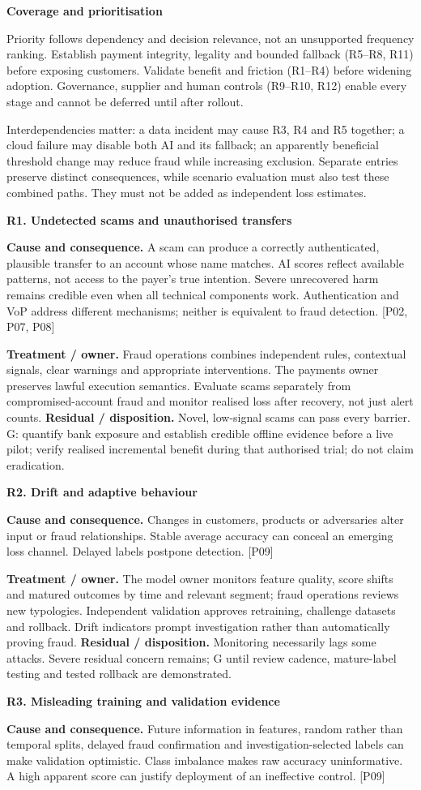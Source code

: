 \documentclass[11pt,a4paper]{article}
\newcommand{\heading}[2]{\vspace*{1mm}{\small\color{ink}\textbf{#1}}\par\vspace{2mm}{\LARGE\color{ink}\textbf{#2}}\par\vspace{3mm}}
\newcommand{\sub}[1]{\par\vspace{2mm}\textbf{\color{ink}#1}\par}
\newcommand{\src}[1]{{\small[#1]}}
\newcommand{\newpageof}[2]{\clearpage\normalsize\fontsize{10.5}{12.5}\selectfont\heading{#1}{#2}}
\newcommand{\risk}[2]{\sub{#1. #2}}
\begin{document}
\sub{Coverage and prioritisation}
Priority follows dependency and decision relevance, not an unsupported frequency ranking. Establish payment integrity, legality and bounded fallback (R5--R8, R11) before exposing customers. Validate benefit and friction (R1--R4) before widening adoption. Governance, supplier and human controls (R9--R10, R12) enable every stage and cannot be deferred until after rollout.

Interdependencies matter: a data incident may cause R3, R4 and R5 together; a cloud failure may disable both AI and its fallback; an apparently beneficial threshold change may reduce fraud while increasing exclusion. Separate entries preserve distinct consequences, while scenario evaluation must also test these combined paths. They must not be added as independent loss estimates.

\newpageof{7 | Analysis and evaluation}{Fraud, model evidence and false rejection}
\risk{R1}{Undetected scams and unauthorised transfers}
\textbf{Cause and consequence.} A scam can produce a correctly authenticated, plausible transfer to an account whose name matches. AI scores reflect available patterns, not access to the payer's true intention. Severe unrecovered harm remains credible even when all technical components work. Authentication and VoP address different mechanisms; neither is equivalent to fraud detection. \src{P02, P07, P08}

\textbf{Treatment / owner.} Fraud operations combines independent rules, contextual signals, clear warnings and appropriate interventions. The payments owner preserves lawful execution semantics. Evaluate scams separately from compromised-account fraud and monitor realised loss after recovery, not just alert counts. \textbf{Residual / disposition.} Novel, low-signal scams can pass every barrier. G: quantify bank exposure and establish credible offline evidence before a live pilot; verify realised incremental benefit during that authorised trial; do not claim eradication.
\risk{R2}{Drift and adaptive behaviour}
\textbf{Cause and consequence.} Changes in customers, products or adversaries alter input or fraud relationships. Stable average accuracy can conceal an emerging loss channel. Delayed labels postpone detection. \src{P09}

\textbf{Treatment / owner.} The model owner monitors feature quality, score shifts and matured outcomes by time and relevant segment; fraud operations reviews new typologies. Independent validation approves retraining, challenge datasets and rollback. Drift indicators prompt investigation rather than automatically proving fraud. \textbf{Residual / disposition.} Monitoring necessarily lags some attacks. Severe residual concern remains; G until review cadence, mature-label testing and tested rollback are demonstrated.
\risk{R3}{Misleading training and validation evidence}
\textbf{Cause and consequence.} Future information in features, random rather than temporal splits, delayed fraud confirmation and investigation-selected labels can make validation optimistic. Class imbalance makes raw accuracy uninformative. A high apparent score can justify deployment of an ineffective control. \src{P09}
\end{document}
